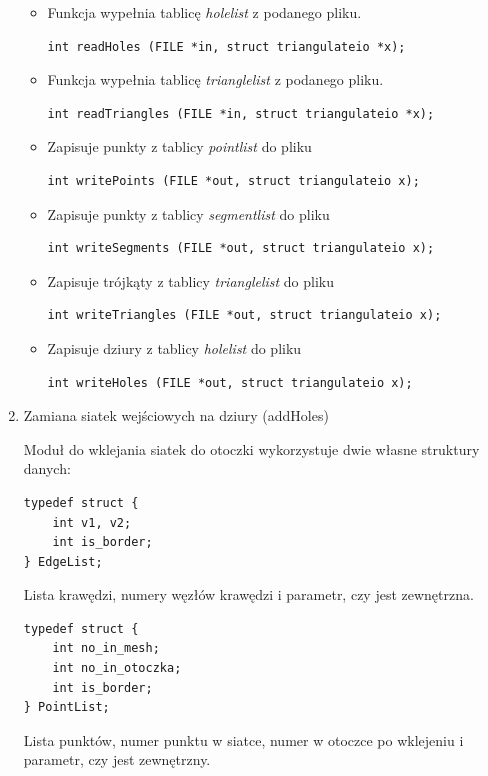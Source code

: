 \documentclass[a4paper,12pt,twoside]{article}
\begin{document}
\begin{enumerate}
\begin{itemize}
\item Funkcja wypełnia tablicę \textit{holelist} z podanego pliku.
\begin{lstlisting}
int readHoles (FILE *in, struct triangulateio *x);
\end{lstlisting}

\item Funkcja wypełnia tablicę \textit{trianglelist} z podanego pliku. 
\begin{lstlisting}
int readTriangles (FILE *in, struct triangulateio *x);
\end{lstlisting}

\item Zapisuje punkty z tablicy \textit{pointlist} do pliku
\begin{lstlisting}
int writePoints (FILE *out, struct triangulateio x); 
\end{lstlisting}

\item Zapisuje punkty z tablicy \textit{segmentlist} do pliku
\begin{lstlisting}
int writeSegments (FILE *out, struct triangulateio x);
\end{lstlisting}

\item Zapisuje trójkąty z tablicy \textit{trianglelist} do pliku
\begin{lstlisting}
int writeTriangles (FILE *out, struct triangulateio x); 
\end{lstlisting}

\item Zapisuje dziury z tablicy \textit{holelist} do pliku
\begin{lstlisting}
int writeHoles (FILE *out, struct triangulateio x); 
\end{lstlisting}
\end{itemize}

\item Zamiana siatek wejściowych na dziury (addHoles)

Moduł do wklejania siatek do otoczki wykorzystuje dwie własne struktury danych:

\begin{lstlisting}
typedef struct {
	int v1, v2; 
	int is_border; 
} EdgeList;
\end{lstlisting}
Lista krawędzi, numery węzłów krawędzi i parametr, czy jest zewnętrzna.

\begin{lstlisting}
typedef struct {
	int no_in_mesh; 		
	int no_in_otoczka;	
	int is_border;			
} PointList;
\end{lstlisting}
Lista punktów, numer punktu w siatce, numer w otoczce po wklejeniu i parametr, czy jest zewnętrzny.


\end{enumerate}
\end{document}
